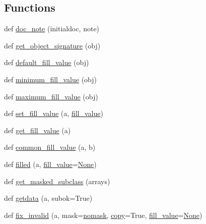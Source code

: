 \subsection*{Functions}
\begin{DoxyCompactItemize}
\item 
def \hyperlink{namespacenumpy_1_1ma_1_1core_a73128bf4780380b8bfe0473d5f9e7474}{doc\+\_\+note} (initialdoc, note)
\item 
def \hyperlink{namespacenumpy_1_1ma_1_1core_a5c2767f7d78663b87366eda291e0fcdf}{get\+\_\+object\+\_\+signature} (obj)
\item 
def \hyperlink{namespacenumpy_1_1ma_1_1core_a3cef629d89518ed23337efe857681a5d}{default\+\_\+fill\+\_\+value} (obj)
\item 
def \hyperlink{namespacenumpy_1_1ma_1_1core_a16432d0ca3937ea84a89c8ff2544af3f}{minimum\+\_\+fill\+\_\+value} (obj)
\item 
def \hyperlink{namespacenumpy_1_1ma_1_1core_a59cecb736927db32ee18c709ddc253d2}{maximum\+\_\+fill\+\_\+value} (obj)
\item 
def \hyperlink{namespacenumpy_1_1ma_1_1core_aa7488cd2b6badc0bbdbdedbb7298b67c}{set\+\_\+fill\+\_\+value} (a, \hyperlink{namespacenumpy_1_1ma_1_1core_ae299ee1b3a1e5865fcdc6ca98dbe24d2}{fill\+\_\+value})
\item 
def \hyperlink{namespacenumpy_1_1ma_1_1core_aef4eddde136d5c3dc7f1bce95187eb1a}{get\+\_\+fill\+\_\+value} (a)
\item 
def \hyperlink{namespacenumpy_1_1ma_1_1core_aeae327c5f2123423bcbc7f8cab59e797}{common\+\_\+fill\+\_\+value} (a, b)
\item 
def \hyperlink{namespacenumpy_1_1ma_1_1core_a9256ccefed32dab91d0128962fdfdf88}{filled} (a, \hyperlink{namespacenumpy_1_1ma_1_1core_ae299ee1b3a1e5865fcdc6ca98dbe24d2}{fill\+\_\+value}=\hyperlink{namespacenumpy_1_1ma_1_1core_a647ee1848dfa3692fe35a663a2aa40b3}{None})
\item 
def \hyperlink{namespacenumpy_1_1ma_1_1core_afe28e50d05730fa2e50ec6c8f2aa5457}{get\+\_\+masked\+\_\+subclass} (arrays)
\item 
def \hyperlink{namespacenumpy_1_1ma_1_1core_a6f5ef3e05d2344f931a42d8ab6e14d66}{getdata} (a, subok=True)
\item 
def \hyperlink{namespacenumpy_1_1ma_1_1core_adf010ab7d0a3763c340cd471092ca008}{fix\+\_\+invalid} (a, mask=\hyperlink{namespacenumpy_1_1ma_1_1core_abafbbb38c7afc60936cc5a55fa23ecfa}{nomask}, \hyperlink{namespacenumpy_1_1ma_1_1core_a9eadff0419a718d13488bd60175f825d}{copy}=True, \hyperlink{namespacenumpy_1_1ma_1_1core_ae299ee1b3a1e5865fcdc6ca98dbe24d2}{fill\+\_\+value}=\hyperlink{namespacenumpy_1_1ma_1_1core_a647ee1848dfa3692fe35a663a2aa40b3}{None})

\end{DoxyCompactItemize}
